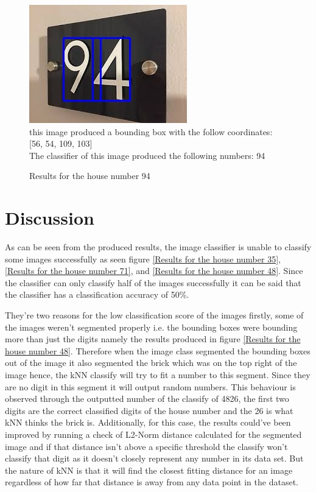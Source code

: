 \documentclass[
	12pt, %
]{fphw}
\begin{document}
\begin{figure}[htp]
	\begin{problem}
	\begin{center}
	\includegraphics[width=0.25\linewidth]{"output/DetectedArea5"}
	\\this image produced a bounding box with the follow coordinates: [56, 54, 109, 103]\\
	The classifier of this image produced the following numbers: 94

	\end{center}
	\end{problem}
	\caption{Results for the house number 94}
	\label{Results for the house number 94}
\end{figure}

\section{Discussion}
As can be seen from the produced results, the image classifier is unable to classify some images successfully as seen figure \ref{Results for the house number 35}, \ref{Results for the house number 71}, and \ref{Results for the house number 48}. Since the classifier can only classify half of the images successfully it can be said that the classifier has a classification accuracy of 50\%.\par

They're two reasons for the low classification score of the images firstly, some of the images weren't segmented properly i.e. the bounding boxes were bounding more than just the digits namely the results produced in figure \ref{Results for the house number 48}. Therefore when the image class segmented the bounding boxes out of the image it also segmented the brick which was on the top right of the image hence, the kNN classify will try to fit a number to this segment. Since they are no digit in this segment it will output random numbers. This behaviour is observed through the outputted number of the classify of 4826, the first two digits are the correct classified digits of the house number and the 26 is what kNN thinks the brick is. Additionally, for this case, the results could've been improved by running a check of L2-Norm distance calculated for the segmented image and if that distance isn't above a specific threshold the classify won't classify that digit as it doesn't closely represent any number in its data set. But the nature of kNN is that it will find the closest fitting distance for an image regardless of how far that distance is away from any data point in the dataset.\par
\end{document}

